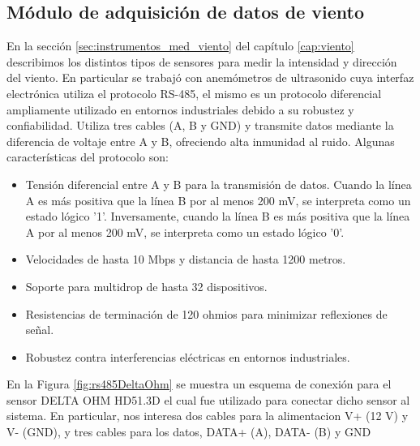 \subsection{Módulo de adquisición de datos de viento}\label{sec:moduloAdquisicionDatoViento}

En la sección \ref{sec:instrumentos_med_viento} del capítulo \ref{cap:viento} describimos los distintos tipos de sensores para medir la intensidad y dirección del viento. En particular se trabajó con anemómetros de ultrasonido cuya interfaz electrónica utiliza el protocolo RS-485, el mismo es un protocolo diferencial ampliamente utilizado en entornos industriales debido a su robustez y confiabilidad. Utiliza tres cables (A, B y GND) y transmite datos mediante la diferencia de voltaje entre A y B, ofreciendo alta inmunidad al ruido. Algunas características del protocolo son:

\begin{itemize}
    \item Tensión diferencial entre A y B para la transmisión de datos. Cuando la línea A es más positiva que la línea B por al menos 200 mV, se interpreta como un estado lógico '1'. Inversamente, cuando la línea B es más positiva que la línea A por al menos 200 mV, se interpreta como un estado lógico '0'.
    \item Velocidades de hasta 10 Mbps y distancia de hasta 1200 metros.
    \item Soporte para multidrop de hasta 32 dispositivos.
    \item Resistencias de terminación de 120 ohmios para minimizar reflexiones de señal.
    \item Robustez contra interferencias eléctricas en entornos industriales.
\end{itemize}

En la Figura \ref{fig:rs485DeltaOhm} se muestra un esquema de conexión para el sensor DELTA OHM HD51.3D el cual fue utilizado para conectar dicho sensor al sistema. En particular, nos interesa dos cables para la alimentacion V+ (12 \unit{\volt}) y V- (GND), y tres cables para los datos, DATA+ (A), DATA- (B) y GND

